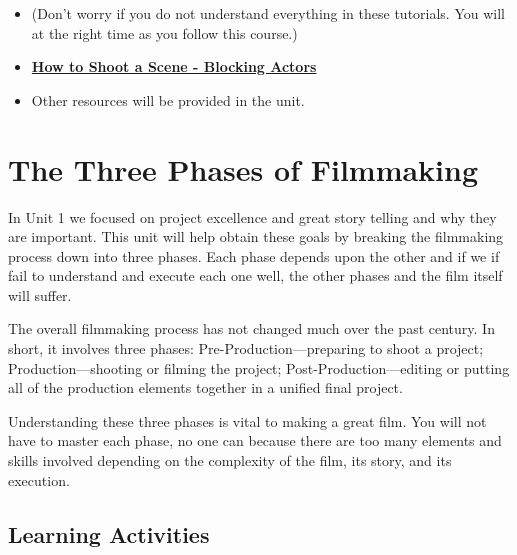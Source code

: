 \documentclass[
]{book}
\begin{document}
\begin{itemize}
\item
  (Don't worry if you do not understand everything in these tutorials. You will at the right time as you follow this course.)
\item
  \href{https://www.youtube.com/watch?v=y9_LW5H2EC4}{\textbf{How to Shoot a Scene - Blocking Actors}}
\item
  Other resources will be provided in the unit.
\end{itemize}

\hypertarget{the-three-phases-of-filmmaking}{%
\section{The Three Phases of Filmmaking}\label{the-three-phases-of-filmmaking}}

In Unit 1 we focused on project excellence and great story telling and why they are important. This unit will help obtain these goals by breaking the filmmaking process down into three phases. Each phase depends upon the other and if we if fail to understand and execute each one well, the other phases and the film itself will suffer.

The overall filmmaking process has not changed much over the past century. In short, it involves three phases: Pre-Production---preparing to shoot a project; Production---shooting or filming the project; Post-Production---editing or putting all of the production elements together in a unified final project.

Understanding these three phases is vital to making a great film. You will not have to master each phase, no one can because there are too many elements and skills involved depending on the complexity of the film, its story, and its execution.

\hypertarget{learning-activities-5}{%
\subsection*{Learning Activities}\label{learning-activities-5}}
\end{document}
